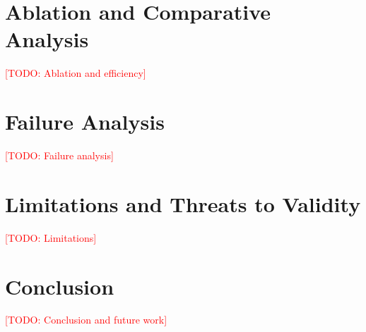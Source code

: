 \documentclass[conference]{IEEEtran}
\newcommand{\todo}[1]{\textcolor{red}{[TODO: #1]}}
\begin{document}
\section{Ablation and Comparative Analysis}
\todo{Ablation and efficiency}

\section{Failure Analysis}
\todo{Failure analysis}

\section{Limitations and Threats to Validity}
\todo{Limitations}

\section{Conclusion}
\todo{Conclusion and future work}



\end{document}
